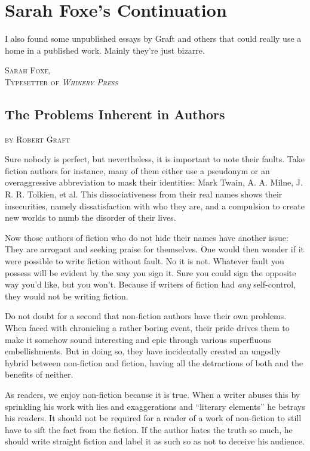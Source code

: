 \chapter{Sarah Foxe's Continuation}
I also found some unpublished essays by Graft and others that could really use a home in a published work. Mainly they're just bizarre.
\begin{flushright}
\textsc{
Sarah Foxe,\\
Typesetter of \emph{Whinery Press}}
\end{flushright}

\section{The Problems Inherent in Authors}
\begin{flushright}
\textsc{
by Robert Graft}
\end{flushright}

Sure nobody is perfect, but nevertheless, it is important to note their faults.
Take fiction authors for instance, many of them either use a pseudonym or an overaggressive abbreviation to mask their identities: Mark Twain, A. A. Milne, J. R. R. Tolkien, et al.
This dissociativeness from their real names shows their insecurities, namely dissatisfaction with who they are, and a compulsion to create new worlds to numb the disorder of their lives.

Now those authors of fiction who do not hide their names have another issue: They are arrogant and seeking praise for themselves.
One would then wonder if it were possible to write fiction without fault. No it is not. Whatever fault you possess will be evident by the way you sign it.
Sure you could sign the opposite way you'd like, but you won't. Because if writers of fiction had \emph{any} self-control, they would not be writing fiction.

Do not doubt for a second that non-fiction authors have their own problems. When faced with chronicling a rather boring event, their pride drives them to make it somehow sound interesting and epic through various superfluous embellishments. But in doing so, they have incidentally created an ungodly hybrid between non-fiction and fiction, having all the detractions of both and the benefits of neither.

As readers, we enjoy non-fiction because it is true. When a writer abuses this by sprinkling his work with lies and exaggerations and ``literary elements'' he betrays his readers.
It should not be required for a reader of a work of non-fiction to still have to sift the fact from the fiction.
If the author hates the truth so much, he should write straight fiction and label it as such so as not to deceive his audience.

